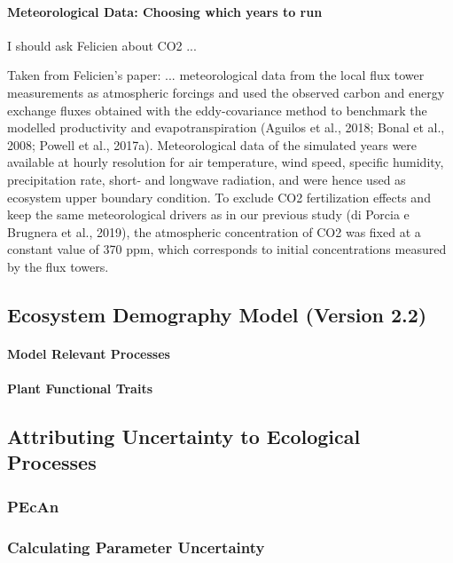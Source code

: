\documentclass[10pt]{article}
\begin{document}
\paragraph{Meteorological Data: Choosing which years to run}

I should ask Felicien about CO2 ... 

Taken from Felicien's paper: ... meteorological data from the local flux tower measurements as atmospheric forcings  and used the observed carbon and energy exchange fluxes obtained with the eddy-covariance method to benchmark the modelled productivity and evapotranspiration (Aguilos et al., 2018; Bonal et al., 2008; Powell et al., 2017a). Meteorological data of the simulated years were available at hourly resolution for air temperature, wind speed, specific humidity, precipitation rate, short- and longwave radiation, and were hence used as ecosystem upper boundary condition. To exclude CO2 fertilization effects and keep the same meteorological drivers as in our previous study (di Porcia e Brugnera et al., 2019), the atmospheric concentration of CO2 was fixed at a constant value of 370 ppm, which corresponds to initial concentrations measured by the flux towers.

\subsection*{Ecosystem Demography Model (Version 2.2)}

\paragraph{Model Relevant Processes}

\paragraph{Plant Functional Traits}

\subsection*{Attributing Uncertainty to Ecological Processes}

\subsubsection*{PEcAn}

\subsubsection*{Calculating Parameter Uncertainty}
\end{document}
